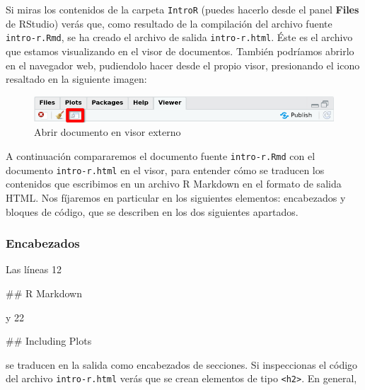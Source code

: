 \documentclass[
  title=normal,
  notoc,
  bib=normal]{mnye}
\newenvironment{Shaded}{\begin{snugshade}}{\end{snugshade}}
\newcommand{\FunctionTok}[1]{\textcolor[rgb]{0.00,0.00,0.00}{#1}}
\begin{document}
Si miras los contenidos de la carpeta \texttt{IntroR} (puedes hacerlo desde el panel \textbf{Files} de \textsf{RStudio}) verás que, como resultado de la compilación del archivo fuente \texttt{intro-r.Rmd}, se ha creado el archivo de salida \texttt{intro-r.html}. Éste es el archivo que estamos visualizando en el visor de documentos. También podríamos abrirlo en el navegador web, pudiendolo hacer desde el propio visor, presionando el icono resaltado en la siguiente imagen:

\begin{figure}

{\centering \includegraphics[width=1\linewidth]{images/open-in-new-window} 

}

\caption{Abrir documento en visor externo}\label{fig:unnamed-chunk-14}
\end{figure}

A continuación compararemos el documento fuente \texttt{intro-r.Rmd} con el documento \texttt{intro-r.html} en el visor, para entender cómo se traducen los contenidos que escribimos en un archivo R Markdown en el formato de salida HTML. Nos fíjaremos en particular en los siguientes elementos: encabezados y bloques de código, que se describen en los dos siguientes apartados.

\hypertarget{encabezados}{%
\subsubsection{Encabezados}\label{encabezados}}

Las líneas 12

\begin{Shaded}
\begin{Highlighting}[]
\FunctionTok{\#\# R Markdown }
\end{Highlighting}
\end{Shaded}

y 22

\begin{Shaded}
\begin{Highlighting}[]
\FunctionTok{\#\# Including Plots}
\end{Highlighting}
\end{Shaded}

se traducen en la salida como encabezados de secciones. Si inspeccionas el código del archivo \texttt{intro-r.html} verás que se crean elementos de tipo \texttt{\textless{}h2\textgreater{}}. En general,
\end{document}
